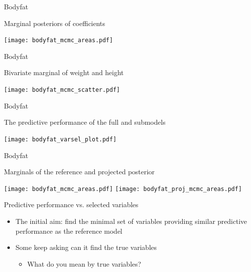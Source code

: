 \documentclass[t]{beamer}
\begin{document}
\begin{frame}{Bodyfat}

  Marginal posteriors of coefficients
  
  \texttt{[image: bodyfat\_mcmc\_areas.pdf]}

\end{frame}

\begin{frame}{Bodyfat}

  Bivariate marginal of weight and height
  
  \texttt{[image: bodyfat\_mcmc\_scatter.pdf]}

\end{frame}

\begin{frame}{Bodyfat}

  The predictive performance of the full and submodels
  
  \texttt{[image: bodyfat\_varsel\_plot.pdf]}

\end{frame}

\begin{frame}{Bodyfat}

  Marginals of the reference and projected posterior

  \vspace{\baselineskip}
  
  \begin{minipage}[t]{1\linewidth}
    \hspace{-1cm}
    \texttt{[image: bodyfat\_mcmc\_areas.pdf]}
  \texttt{[image: bodyfat\_proj\_mcmc\_areas.pdf]}
\end{minipage}
\end{frame}

\begin{frame}{Predictive performance vs. selected variables}

  \begin{itemize}
  \item<+-> The initial aim: find the minimal set of variables
    providing similar predictive performance as the reference model
  \item<+-> Some keep asking can it find the true variables
    \begin{itemize}
    \item<3-> What do you mean by true variables?
    \end{itemize}
  \end{itemize}


\end{frame}
\end{document}
